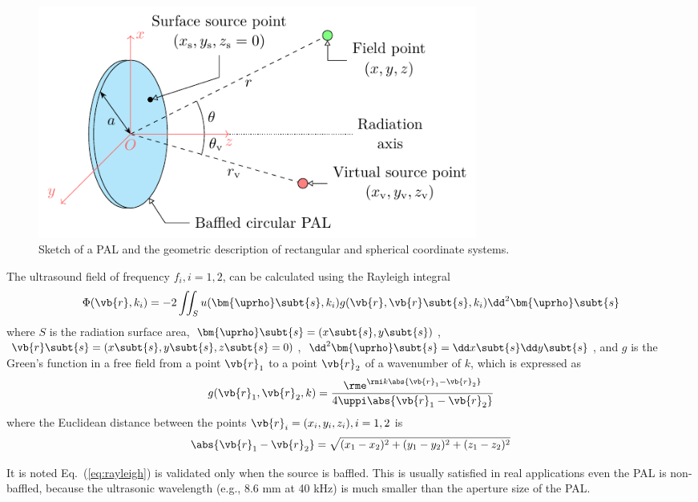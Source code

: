 \begin{figure}[h]
    \centering
    \includegraphics[width = 0.7\textwidth]{Figures/Sketch_200426.pdf}
    \caption{Sketch of a PAL and the geometric description of rectangular and spherical coordinate systems.}
    \label{fig:pal3d:model}
\end{figure}

The ultrasound field of frequency $f_i,i=1,2$, can be calculated using the Rayleigh integral \cite{Pierce2019AcousticsIntroductionIts} 
\begin{equation}
    \Phi(\vb{r}, k_i) = - 2 \iint_S 
    u(\bm{\uprho}\subt{s},k_i) 
    g(\vb{r},\vb{r}\subt{s},k_i)
    \dd^2 \bm{\uprho}\subt{s}
    \label{eq:rayleigh}
\end{equation}
where $S$ is the radiation surface area, $\bm{\uprho}\subt{s} = (x\subt{s},y\subt{s})$, $\vb{r}\subt{s} = (x\subt{s},y\subt{s},z\subt{s} = 0)$, $\dd^2\bm{\uprho}\subt{s} = \dd x\subt{s}\dd y\subt{s}$, and $g$ is the Green's function in a free field from a point $\vb{r}_1$ to a point $\vb{r}_2$ of a wavenumber of $k$, which is expressed as \cite{Pierce2019AcousticsIntroductionIts}
\begin{equation}
    g(\vb{r}_1,\vb{r}_2,k)
    =
    \frac{\rme^{\rmi k \abs{\vb{r}_1-\vb{r}_2}} }{4\uppi \abs{\vb{r}_1-\vb{r}_2}}
    \label{eq:green_function_free_field}
\end{equation}
where the Euclidean distance between the points $\vb{r}_i = (x_i,y_i,z_i), i=1,2$ is 
\begin{equation}
\abs{\vb{r}_1-\vb{r}_2}
=
\sqrt{(x_1-x_2)^2 + (y_1-y_2)^2 + (z_1-z_2)^2}
\end{equation}

It is noted Eq.~(\ref{eq:rayleigh}) is validated only when the source is baffled. 
This is usually satisfied in real applications even the PAL is non-baffled, because the ultrasonic wavelength (e.g., 8.6 mm at 40 kHz) is much smaller than the aperture size of the PAL.

